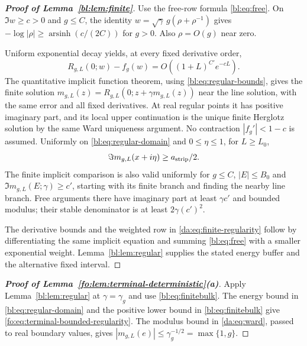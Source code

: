 \documentclass[11pt]{article}
\numberwithin{equation}{section}
\theoremstyle{remark}
\begin{document}
\begin{proof}[\textbf{Proof of Lemma~\ref{bl:lem:finite}}]
Use the free-row formula \eqref{bl:eq:free}. On $\Im w\ge c>0$
and $g\le C$, the identity
$w=\sqrt\gamma\,g(\rho+\rho^{-1})$ gives
$-\log|\rho|\ge\operatorname{arsinh}(c/(2C))$ for $g>0$.
Also $\rho=O(g)$ near zero.

Uniform exponential decay yields, at every fixed derivative order,
\begin{equation}\label{bl:eq:finiteerror}
 R_{g,L}(0;w)-f_g(w)=O((1+L)^{C'} e^{-cL}).
\end{equation}
The quantitative implicit function theorem, using
\eqref{bl:eq:regular-bounds}, gives the finite solution
$m_{g,L}(z)=R_{g,L}(0;z+\gamma m_{g,L}(z))$ near the line solution,
with the same error and all fixed derivatives. At real regular points
it has positive imaginary part, and its local upper continuation is
the unique finite Herglotz solution by the same Ward uniqueness
argument. No contraction $|f_g'|<1-c$ is assumed. Uniformly on
\eqref{bl:eq:regular-domain} and $0\le\eta\le1$, for $L\ge L_0$,
\begin{equation}\label{bl:eq:finitebulk}
 \Im m_{g,L}(x+i\eta)\ge a_{\rm strip}/2.
\end{equation}
The finite implicit comparison is also valid uniformly for
$g\le C$, $|E|\le B_0$ and $\Im m_{g,L}(E;\gamma)\ge c'$,
starting with its finite branch and finding
the nearby line branch. Free arguments there have imaginary part
at least $\gamma c'$ and bounded modulus; their stable denominator is
at least $2\gamma (c')^2$. 


The derivative bounds and the weighted row in
\eqref{da:eq:finite-regularity} follow by differentiating the same
implicit equation and summing \eqref{bl:eq:free} with a smaller
exponential weight. Lemma~\ref{bl:lem:regular} supplies the stated
energy buffer and the alternative fixed interval.
\end{proof}

\begin{proof}[\textbf{Proof of Lemma~\ref{fo:lem:terminal-deterministic}(a)}]
Apply Lemma~\ref{bl:lem:regular} at $\gamma=\gamma_g$ and use
\eqref{bl:eq:finitebulk}. The energy bound in
\eqref{bl:eq:regular-domain} and the positive lower bound in
\eqref{bl:eq:finitebulk} give \eqref{fo:eq:terminal-bounded-regularity}.
The modulus bound in \eqref{da:eq:ward}, passed to real boundary values, gives
$|m_{g,L}(e)|\le\gamma_g^{-1/2}=\max\{1,g\}$.
\end{proof}
\end{document}
